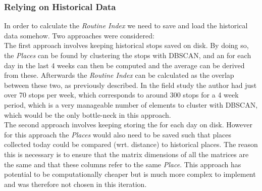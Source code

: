\subsubsection*{Relying on Historical Data}
In order to calculate the \textit{Routine Index} we need to save and load the historical data somehow. Two approaches were considered:\\

The first approach involves keeping historical stops saved on disk. By doing so, the \textit{Places} can be found by clustering the stops with DBSCAN, and an  for each day in the last 4 weeks can then be computed and the average  can be derived from these. Afterwards the \textit{Routine Index} can be calculated as the overlap between these two, as previously described. In the field study the author had just over 70 stops per week, which corresponds to around 300 stops for a 4 week period, which is a very manageable number of elements to cluster with DBSCAN, which would be the only bottle-neck in this approach.\\

The second approach involves keeping storing the  for each day  on disk. However for this approach the \textit{Places} would also need to be saved such that places collected today could be compared (wrt. distance) to historical places. The reason this is necessary is to ensure that the matrix dimensions of all the matrices are the same and that these columns refer to the same \textit{Place}.  This approach has potential to be computationally cheaper but is much more complex to implement and was therefore not chosen in this iteration.
